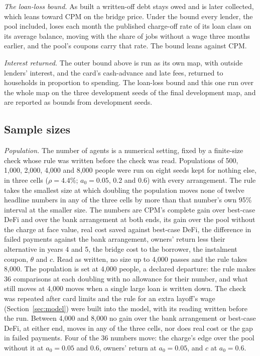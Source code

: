 \emph{The loan-loss bound.} As built a written-off debt stays owed and is later collected, which leans toward CPM
on the bridge price. Under the bound every lender, the pool included, loses each month the published charge-off
rate of its loan class on its average balance, moving with the share of jobs without a wage three months earlier,
and the pool's coupons carry that rate. The bound leans against CPM.

\emph{Interest returned.} The outer bound above is run as its own map, with outside lenders' interest, and the
card's cash-advance and late fees, returned to households in proportion to spending. The loan-loss bound and this
one run over the whole map on the three development seeds of the final development map, and are reported as bounds
from development seeds.

\subsection{Sample sizes}

\emph{Population.} The number of agents is a numerical setting, fixed by a finite-size check whose rule was written
before the check was read. Populations of 500, 1,000, 2,000, 4,000 and 8,000 people were run on eight seeds kept for
nothing else, in three cells ($\rho = 4.4\%$; $a_{0} = 0.05$, 0.2 and 0.6) with every arrangement. The rule takes
the smallest size at which doubling the population moves none of twelve headline numbers in any of the three cells
by more than that number's own 95\% interval at the smaller size. The numbers are CPM's complete gain over best-case DeFi and over
the bank arrangement at both ends, its gain over the pool without the charge at face value, real cost saved against
best-case DeFi, the difference in failed payments against the bank arrangement, owners' return less their
alternative in years 4 and 5, the bridge cost to the borrower, the instalment coupon, $\theta$ and $c$. Read as
written, no size up to 4,000 passes and the rule takes 8,000. The population is set at 4,000 people, a declared
departure: the rule makes 36 comparisons at each doubling with no allowance for their number, and what still moves
at 4,000 moves when a single large loan is written down. The check was repeated after card limits and the rule for
an extra layoff's wage (Section~\ref{sec:model}) were built into the model, with its reading written before the run. Between 4,000 and 8,000 no gain over the bank
arrangement or best-case DeFi, at either end, moves in any of the three cells, nor does real cost or the gap in
failed payments. Four of the 36 numbers move: the charge's edge over the pool without it at $a_{0} = 0.05$ and 0.6,
owners' return at $a_{0} = 0.05$, and $c$ at $a_{0} = 0.6$.

